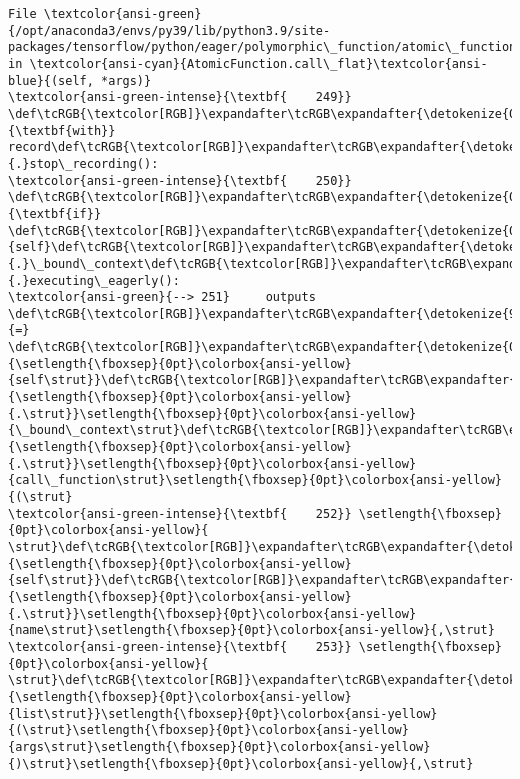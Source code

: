 \documentclass[11pt]{article}
\begin{document}
\begin{Verbatim}[commandchars=\\\{\}, frame=single, framerule=2mm, rulecolor=\color{outerrorbackground}]
File \textcolor{ansi-green}{/opt/anaconda3/envs/py39/lib/python3.9/site-packages/tensorflow/python/eager/polymorphic\_function/atomic\_function.py:251}, in \textcolor{ansi-cyan}{AtomicFunction.call\_flat}\textcolor{ansi-blue}{(self, *args)}
\textcolor{ansi-green-intense}{\textbf{    249}} \def\tcRGB{\textcolor[RGB]}\expandafter\tcRGB\expandafter{\detokenize{0,135,0}}{\textbf{with}} record\def\tcRGB{\textcolor[RGB]}\expandafter\tcRGB\expandafter{\detokenize{98,98,98}}{.}stop\_recording():
\textcolor{ansi-green-intense}{\textbf{    250}}   \def\tcRGB{\textcolor[RGB]}\expandafter\tcRGB\expandafter{\detokenize{0,135,0}}{\textbf{if}} \def\tcRGB{\textcolor[RGB]}\expandafter\tcRGB\expandafter{\detokenize{0,135,0}}{self}\def\tcRGB{\textcolor[RGB]}\expandafter\tcRGB\expandafter{\detokenize{98,98,98}}{.}\_bound\_context\def\tcRGB{\textcolor[RGB]}\expandafter\tcRGB\expandafter{\detokenize{98,98,98}}{.}executing\_eagerly():
\textcolor{ansi-green}{--> 251}     outputs \def\tcRGB{\textcolor[RGB]}\expandafter\tcRGB\expandafter{\detokenize{98,98,98}}{=} \def\tcRGB{\textcolor[RGB]}\expandafter\tcRGB\expandafter{\detokenize{0,135,0}}{\setlength{\fboxsep}{0pt}\colorbox{ansi-yellow}{self\strut}}\def\tcRGB{\textcolor[RGB]}\expandafter\tcRGB\expandafter{\detokenize{98,98,98}}{\setlength{\fboxsep}{0pt}\colorbox{ansi-yellow}{.\strut}}\setlength{\fboxsep}{0pt}\colorbox{ansi-yellow}{\_bound\_context\strut}\def\tcRGB{\textcolor[RGB]}\expandafter\tcRGB\expandafter{\detokenize{98,98,98}}{\setlength{\fboxsep}{0pt}\colorbox{ansi-yellow}{.\strut}}\setlength{\fboxsep}{0pt}\colorbox{ansi-yellow}{call\_function\strut}\setlength{\fboxsep}{0pt}\colorbox{ansi-yellow}{(\strut}
\textcolor{ansi-green-intense}{\textbf{    252}} \setlength{\fboxsep}{0pt}\colorbox{ansi-yellow}{        \strut}\def\tcRGB{\textcolor[RGB]}\expandafter\tcRGB\expandafter{\detokenize{0,135,0}}{\setlength{\fboxsep}{0pt}\colorbox{ansi-yellow}{self\strut}}\def\tcRGB{\textcolor[RGB]}\expandafter\tcRGB\expandafter{\detokenize{98,98,98}}{\setlength{\fboxsep}{0pt}\colorbox{ansi-yellow}{.\strut}}\setlength{\fboxsep}{0pt}\colorbox{ansi-yellow}{name\strut}\setlength{\fboxsep}{0pt}\colorbox{ansi-yellow}{,\strut}
\textcolor{ansi-green-intense}{\textbf{    253}} \setlength{\fboxsep}{0pt}\colorbox{ansi-yellow}{        \strut}\def\tcRGB{\textcolor[RGB]}\expandafter\tcRGB\expandafter{\detokenize{0,135,0}}{\setlength{\fboxsep}{0pt}\colorbox{ansi-yellow}{list\strut}}\setlength{\fboxsep}{0pt}\colorbox{ansi-yellow}{(\strut}\setlength{\fboxsep}{0pt}\colorbox{ansi-yellow}{args\strut}\setlength{\fboxsep}{0pt}\colorbox{ansi-yellow}{)\strut}\setlength{\fboxsep}{0pt}\colorbox{ansi-yellow}{,\strut}

\end{Verbatim}
\end{document}
